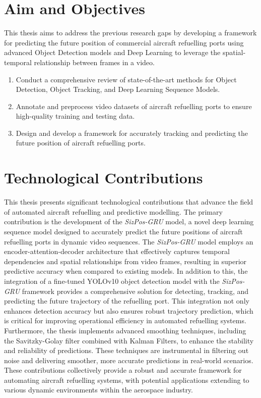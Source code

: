 \documentclass[12pt,oneside]{book} %
\begin{document}
\section{Aim and Objectives}
This thesis aims to address the previous research gaps by developing a
framework for predicting the future position of commercial aircraft refuelling
ports using advanced Object Detection models and Deep Learning to leverage the
spatial-temporal relationship between frames in a video.
\begin{enumerate}
    \item Conduct a comprehensive review of state-of-the-art methods for Object
          Detection, Object Tracking, and Deep Learning Sequence Models.
    \item Annotate and preprocess video datasets of aircraft refuelling ports to ensure
          high-quality training and testing data.
    \item Design and develop a framework for accurately tracking and predicting the
          future position of aircraft refuelling ports.
\end{enumerate}

\section{Technological Contributions}
This thesis presents significant technological contributions that advance the
field of automated aircraft refuelling and predictive modelling. The primary
contribution is the development of the \textit{SizPos-GRU} model, a novel deep
learning sequence model designed to accurately predict the future positions of
aircraft refuelling ports in dynamic video sequences. The \textit{SizPos-GRU}
model employs an encoder-attention-decoder architecture that effectively
captures temporal dependencies and spatial relationships from video frames,
resulting in superior predictive accuracy when compared to existing models. In
addition to this, the integration of a fine-tuned YOLOv10 object detection
model with the \textit{SizPos-GRU} framework provides a comprehensive solution for
detecting, tracking, and predicting the future trajectory of the refuelling
port. This integration not only enhances detection accuracy but also ensures
robust trajectory prediction, which is critical for improving operational
efficiency in automated refuelling systems. Furthermore, the thesis implements
advanced smoothing techniques, including the Savitzky-Golay filter combined
with Kalman Filters, to enhance the stability and reliability of predictions.
These techniques are instrumental in filtering out noise and delivering
smoother, more accurate predictions in real-world scenarios. These
contributions collectively provide a robust and accurate framework for
automating aircraft refuelling systems, with potential applications extending
to various dynamic environments within the aerospace industry.
\end{document}
